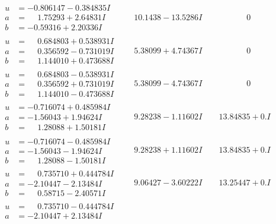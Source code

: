 \documentclass[1p]{elsarticle_modified}
\theoremstyle{definition}
\begin{document}
$$\begin{array}{c|c|c}
\begin{aligned}
u &= -0.806147 - 0.384835 I \\
a &= \phantom{-}1.75293 + 2.64831 I \\
b &= -0.59316 + 2.20336 I\end{aligned}
 & \phantom{-}10.1438 - 13.5286 I & \phantom{-0.000000 } 0 \\ \hline\begin{aligned}
u &= \phantom{-}0.684803 + 0.538931 I \\
a &= \phantom{-}0.356592 - 0.731019 I \\
b &= \phantom{-}1.144010 + 0.473688 I\end{aligned}
 & \phantom{-}5.38099 + 4.74367 I & \phantom{-0.000000 } 0 \\ \hline\begin{aligned}
u &= \phantom{-}0.684803 - 0.538931 I \\
a &= \phantom{-}0.356592 + 0.731019 I \\
b &= \phantom{-}1.144010 - 0.473688 I\end{aligned}
 & \phantom{-}5.38099 - 4.74367 I & \phantom{-0.000000 } 0 \\ \hline\begin{aligned}
u &= -0.716074 + 0.485984 I \\
a &= -1.56043 + 1.94624 I \\
b &= \phantom{-}1.28088 + 1.50181 I\end{aligned}
 & \phantom{-}9.28238 - 1.11602 I & \phantom{-}13.84835 + 0. I\phantom{ +0.000000I} \\ \hline\begin{aligned}
u &= -0.716074 - 0.485984 I \\
a &= -1.56043 - 1.94624 I \\
b &= \phantom{-}1.28088 - 1.50181 I\end{aligned}
 & \phantom{-}9.28238 + 1.11602 I & \phantom{-}13.84835 + 0. I\phantom{ +0.000000I} \\ \hline\begin{aligned}
u &= \phantom{-}0.735710 + 0.444784 I \\
a &= -2.10447 - 2.13484 I \\
b &= \phantom{-}0.58715 - 2.40571 I\end{aligned}
 & \phantom{-}9.06427 - 3.60222 I & \phantom{-}13.25447 + 0. I\phantom{ +0.000000I} \\ \hline\begin{aligned}
u &= \phantom{-}0.735710 - 0.444784 I \\
a &= -2.10447 + 2.13484 I \\

\end{aligned}
\end{array}$$
\end{document}
